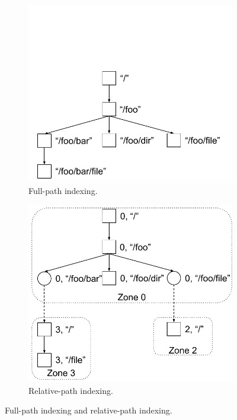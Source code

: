 \begin{figure}
    \begin{subfigure}{.5\textwidth}
        \centering
        \includegraphics[width=.9\linewidth]{proposal/fig/FPI}
        \caption{\label{subfig:FPI} Full-path indexing.}
    \end{subfigure}
    \begin{subfigure}{.5\textwidth}
        \centering
        \includegraphics[width=.9\linewidth]{proposal/fig/RPI}
        \caption{\label{subfig:RPI} Relative-path indexing.}
    \end{subfigure}
    \caption[Full-path indexing and relative-path indexing]{\label{fig:FPIRPI}
        Full-path indexing and relative-path indexing.}
\end{figure}

